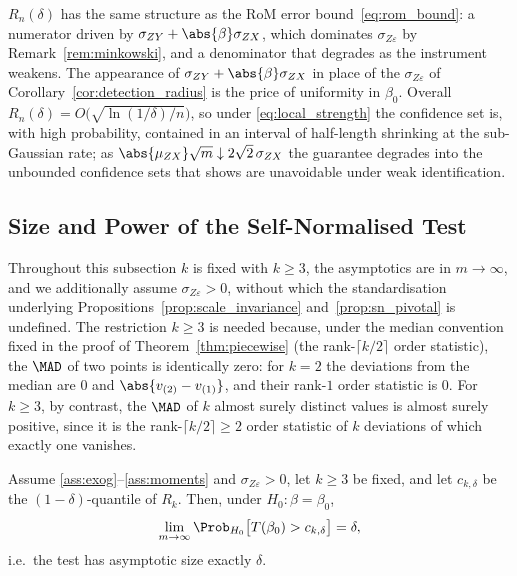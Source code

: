 \begin{remark}
\label{rem:cs_radius}
$R_n(\delta)$ has the same structure as the RoM error bound~\eqref{eq:rom_bound}: a numerator driven by $\sigma_{ZY} + \abs{\beta}\sigma_{ZX}$, which dominates $\sigma_{Z\varepsilon}$ by Remark~\ref{rem:minkowski}, and a denominator that degrades as the instrument weakens. The appearance of $\sigma_{ZY} + \abs{\beta}\sigma_{ZX}$ in place of the $\sigma_{Z\varepsilon}$ of Corollary~\ref{cor:detection_radius} is the price of uniformity in $\beta_0$. Overall $R_n(\delta) = O\bigl(\sqrt{\ln(1/\delta)/n}\bigr)$, so under \eqref{eq:local_strength} the confidence set is, with high probability, contained in an interval of half-length shrinking at the sub-Gaussian rate; as $\abs{\mu_{ZX}}\sqrt{m} \downarrow 2\sqrt{2}\,\sigma_{ZX}$ the guarantee degrades into the unbounded confidence sets that \citet{dufour1997some} shows are unavoidable under weak identification.
\end{remark}



\subsection{Size and Power of the Self-Normalised Test}
\label{sec:sn_size_power}

Throughout this subsection $k$ is fixed with $k \ge 3$, the asymptotics are in $m \to \infty$, and we additionally assume $\sigma_{Z\varepsilon} > 0$, without which the standardisation underlying Propositions~\ref{prop:scale_invariance} and~\ref{prop:sn_pivotal} is undefined. The restriction $k \ge 3$ is needed because, under the median convention fixed in the proof of Theorem~\ref{thm:piecewise} (the rank-$\lceil k/2\rceil$ order statistic), the $\MAD$ of two points is identically zero: for $k=2$ the deviations from the median are $0$ and $\abs{v_{(2)} - v_{(1)}}$, and their rank-$1$ order statistic is $0$. For $k \ge 3$, by contrast, the $\MAD$ of $k$ almost surely distinct values is almost surely positive, since it is the rank-$\lceil k/2\rceil \ge 2$ order statistic of $k$ deviations of which exactly one vanishes.

\begin{corollary}
\label{cor:sn_size}
Assume \ref{ass:exog}--\ref{ass:moments} and $\sigma_{Z\varepsilon} > 0$, let $k \ge 3$ be fixed, and let $c_{k,\delta}$ be the $(1-\delta)$-quantile of $R_k$. Then, under $H_0\colon\beta=\beta_0$,
\[
  \lim_{m\to\infty}\Prob_{H_0}\bigl[T(\beta_0) > c_{k,\delta}\bigr] = \delta,
\]
i.e.\ the test has asymptotic size exactly $\delta$.
\end{corollary}

